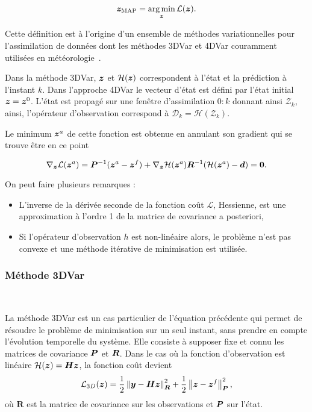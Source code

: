 \begin{equation*}
    \bm z_{\text{MAP}} = \operatorname*{arg\,min}_{\bm z} \mathcal L(\bm z).
\end{equation*}

Cette définition est à l'origine d'un ensemble de méthodes variationnelles pour l'assimilation de données dont les méthodes 3DVar et 4DVar couramment utilisées en météorologie~\cite{talagrand1997assimilation}.

Dans la méthode 3DVar, $\bm z$ et $\mathcal H(\bm z)$ correspondent à l'état et la prédiction à l'instant $k$. Dans l'approche 4DVar le vecteur d'état est défini par l'état initial $\bm z = \bm z^0$. L'état est propagé sur une fenêtre d'assimilation $0:k$ donnant ainsi $\mathcal{Z}_k$, ainsi, l'opérateur d'observation correspond à $\mathcal D_k = \mathcal H(\mathcal{Z}_k)$.

Le minimum $\bm z^a$ de cette fonction est obtenue en annulant son gradient qui se trouve être en ce point

\begin{equation*}
    \nabla_{\bm z} \mathcal L(\bm z^a) = \bm{P}^{-1} (\bm z^a - \bm z^f) + \nabla_{\bm z} \mathcal H (\bm z^a) \bm{R}^{-1}(\mathcal H(\bm z^a) - \bm d) = \bm 0.
\end{equation*}

On peut faire plusieurs remarques :

\begin{itemize}
    \item L'inverse de la dérivée seconde de la fonction coût $\mathcal L$, Hessienne, est une approximation à l'ordre 1 de la matrice de covariance a posteriori,
    \item Si l'opérateur d'observation $h$ est non-linéaire alors, le problème n'est pas convexe et une méthode itérative de minimisation est utilisée.
\end{itemize}

\subsubsection{Méthode 3DVar}~\label{subsec:3dvar}

La méthode 3DVar est un cas particulier de l'équation précédente qui permet de résoudre le problème de minimisation sur un seul instant, sans prendre en compte l'évolution temporelle du système. Elle consiste à supposer fixe et connu les matrices de covariance $\bm{P}$ et $\bm{R}$. Dans le cas où la fonction d'observation est linéaire $\mathcal H(\bm z) = \bm{H} \bm z$, la fonction coût devient
\begin{equation*}
    \mathcal L_{3D}(\bm z) = \frac{1}{2}\left\lVert \bm{y}-\bm{H} \bm z \right\rVert^2_{\bm R} + \frac{1}{2}\left\lVert \bm z-\bm z^f \right\rVert_{\bm{P}}^2,
\end{equation*}où $\bm R$ est la matrice de covariance sur les observations et $\bm{P}$ sur l'état.

